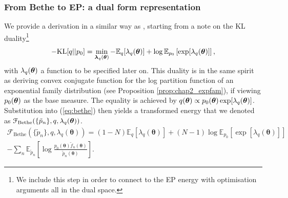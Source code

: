 \subsubsection{From Bethe to EP: a dual form representation}
\label{sec:ep_fixed_points}
We provide a derivation in a similar way as \cite{heskes:bp_fixed_point2002}, starting from a note on the KL duality\footnote{We include this step in order to connect to the EP energy with optimisation arguments all in the dual space.}
\begin{equation}
 -\mathrm{KL}[q||p_0] = \min_{\bm{\lambda}_{q}(\bm{\theta})} - \mathbb{E}_q[\lambda_q(\bm{\theta})] + \log \mathbb{E}_{p_0} \left[ \exp [\lambda_q(\bm{\theta})] \right],
 \label{eq:kl_duality}
\end{equation}
with $\lambda_q(\bm{\theta})$ a function to be specified later on. This duality is in the same spirit as deriving convex conjugate function for the log partition function of an exponential family distribution (see Proposition \ref{prop:chap2_expfam}), if viewing $p_0(\bm{\theta})$ as the base measure.
The equality is achieved by $q(\bm{\theta}) \propto p_0(\bm{\theta}) \exp[\lambda_q(\bm{\theta})]$.
%
Substitution into (\ref{eq:bethe}) then yields a transformed energy that we denoted as $\mathcal{F}_{\text{Bethe}}(\{ \tilde{p}_n \}, q, \lambda_q(\bm{\theta}))$.
%
\begin{equation}
\begin{aligned}
\mathcal{F}_{\text{Bethe}}(\{ \tilde{p}_n \}, q, \lambda_q(\bm{\theta})) = (1 - N) \mathbb{E}_q[\lambda_q(\bm{\theta})] + (N - 1) \log \mathbb{E}_{p_0} \left[ \exp [\lambda_q(\bm{\theta})] \right] \\
- \sum_n \mathbb{E}_{\tilde{p}_n} \left[ \log \frac{p_0(\bm{\theta}) \tilde{f}_n(\bm{\theta})}{\tilde{p}_n(\bm{\theta})} \right].
\label{eq:bethe_energy_transformed}
\end{aligned}
\end{equation}

